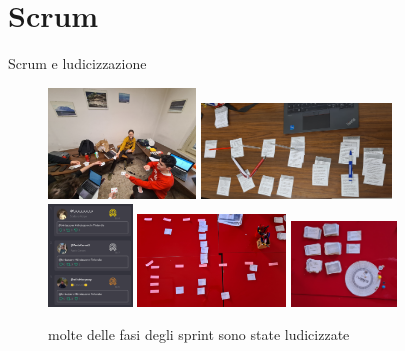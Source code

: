 \documentclass{beamer}
\begin{document}
\section{Scrum}
\begin{frame}{Scrum e ludicizzazione}
	\begin{figure}
		\includegraphics[width=0.35\textwidth]{planning-poker}
		\includegraphics[width=0.45\textwidth]{essence-4-0} \\
		\includegraphics[width=0.2\textwidth]{birdazzone-game}
		\includegraphics[width=0.35\textwidth]{scrumble}
		\includegraphics[width=0.25\textwidth]{scrumble-bis}
		\caption{molte delle fasi degli sprint sono state ludicizzate}
	\end{figure}
\end{frame}
\end{document}
